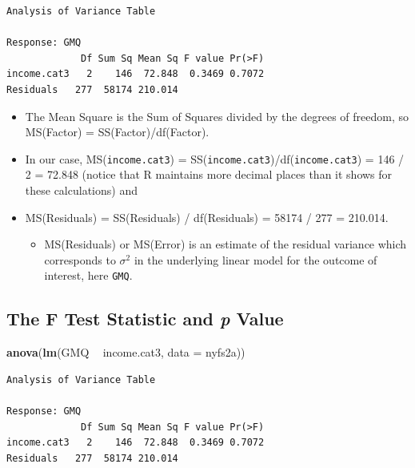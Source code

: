 \documentclass[
]{book}
\newenvironment{Shaded}{\begin{snugshade}}{\end{snugshade}}
\newcommand{\DataTypeTok}[1]{\textcolor[rgb]{0.13,0.29,0.53}{#1}}
\newcommand{\KeywordTok}[1]{\textcolor[rgb]{0.13,0.29,0.53}{\textbf{#1}}}
\newcommand{\NormalTok}[1]{#1}
\newcommand{\OperatorTok}[1]{\textcolor[rgb]{0.81,0.36,0.00}{\textbf{#1}}}
\newcommand{\StringTok}[1]{\textcolor[rgb]{0.31,0.60,0.02}{#1}}
\providecommand{\tightlist}{%
  \setlength{\itemsep}{0pt}\setlength{\parskip}{0pt}}
\begin{document}
\begin{verbatim}
Analysis of Variance Table

Response: GMQ
             Df Sum Sq Mean Sq F value Pr(>F)
income.cat3   2    146  72.848  0.3469 0.7072
Residuals   277  58174 210.014               
\end{verbatim}

\begin{itemize}
\tightlist
\item
  The Mean Square is the Sum of Squares divided by the degrees of freedom, so MS(Factor) = SS(Factor)/df(Factor).
\item
  In our case, MS(\texttt{income.cat3}) = SS(\texttt{income.cat3})/df(\texttt{income.cat3}) = 146 / 2 = 72.848 (notice that R maintains more decimal places than it shows for these calculations) and
\item
  MS(Residuals) = SS(Residuals) / df(Residuals) = 58174 / 277 = 210.014.

  \begin{itemize}
  \tightlist
  \item
    MS(Residuals) or MS(Error) is an estimate of the residual variance which corresponds to \(\sigma^2\) in the underlying linear model for the outcome of interest, here \texttt{GMQ}.
  \end{itemize}
\end{itemize}

\hypertarget{the-f-test-statistic-and-p-value}{%
\subsection{\texorpdfstring{The F Test Statistic and \emph{p} Value}{The F Test Statistic and p Value}}\label{the-f-test-statistic-and-p-value}}

\begin{Shaded}
\begin{Highlighting}[]
\KeywordTok{anova}\NormalTok{(}\KeywordTok{lm}\NormalTok{(GMQ }\OperatorTok{~}\StringTok{ }\NormalTok{income.cat3, }\DataTypeTok{data =}\NormalTok{ nyfs2a))}
\end{Highlighting}
\end{Shaded}

\begin{verbatim}
Analysis of Variance Table

Response: GMQ
             Df Sum Sq Mean Sq F value Pr(>F)
income.cat3   2    146  72.848  0.3469 0.7072
Residuals   277  58174 210.014               
\end{verbatim}
\end{document}
